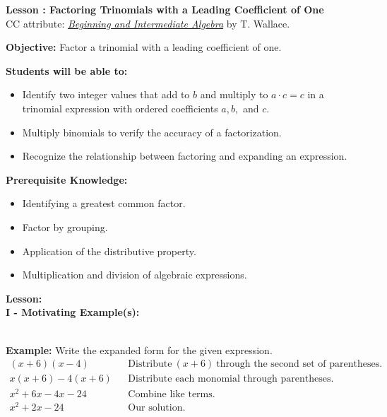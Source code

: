 \documentclass[12pt]{article}
\theoremstyle{definition}
\begin{document}
{\bf \large Lesson : Factoring Trinomials with a Leading Coefficient of One}
\\ CC attribute: \href{http://www.wallace.ccfaculty.org/book/book.html}{\it{Beginning and Intermediate Algebra}} by T. Wallace. 
\hfill \doclicenseImage[imagewidth=5em]\\
\par
{\bf Objective:} Factor a trinomial with a leading coefficient of one.\\
\par
{\bf Students will be able to:}
\begin{itemize}
	\item Identify two integer values that add to $b$ and multiply to $a\cdot c=c$ in a trinomial expression with ordered coefficients $a,b,$ and $c$.
	\item Multiply binomials to verify the accuracy of a factorization.
	\item Recognize the relationship between factoring and expanding an expression.
\end{itemize}
{\bf Prerequisite Knowledge:}
\begin{itemize}
	\item Identifying a greatest common factor.
	\item Factor by grouping.
	\item Application of the distributive property.
	\item Multiplication and division of algebraic expressions.
\end{itemize}
\hrulefill

{\bf Lesson:}\\
{\bf I - Motivating Example(s):}\\
\ \par
{\bf Example:} Write the expanded form for the given expression.
  \begin{eqnarray*}
    (x + 6) (x - 4) &  & \text{Distribute} \ (x + 6) \ \text{through the second set of parentheses.}\\
    x (x + 6) - 4 (x + 6) &  & \text{Distribute each monomial through parentheses.}\\
    x^2 + 6 x - 4 x - 24 &  & \text{Combine like terms.}\\
    x^2 + 2 x - 24 &  & \text{Our solution.}
  \end{eqnarray*}	
\end{document}
